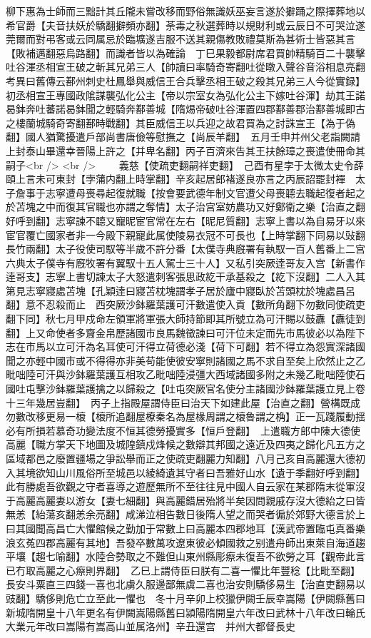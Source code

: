 柳下惠為士師而三黜計其丘隴未嘗改移而野俗無識妖巫妄言遂於擗踊之際擇葬地以希官爵【夫音扶妖於驕翻擗頻亦翻】荼毒之秋選葬時以規財利或云辰日不可哭泣遂莞爾而對弔客或云同属忌於臨壙遂吉服不送其親傷教敗禮莫斯為甚術士皆惡其言【敗補邁翻惡烏路翻】而識者皆以為確論　丁巳果毅都尉席君買帥精騎百二十襲擊吐谷渾丞相宣王破之斬其兄弟三人【帥讀曰率騎奇寄翻吐從暾入聲谷音浴相息亮翻　考異曰舊傳云鄯州刺史杜鳳舉與威信王合兵擊丞相王破之殺其兄弟三人今從實録】初丞相宣王專國政隂謀襲弘化公主【帝以宗室女為弘化公主下嫁吐谷渾】劫其王諾曷鉢奔吐蕃諾曷鉢聞之輕騎奔鄯善城【隋焬帝破吐谷渾置四郡鄯善郡治鄯善城即古之樓蘭城騎奇寄翻鄯時戰翻】其臣威信王以兵迎之故君買為之討誅宣王【為于偽翻】國人猶驚擾遣戶部尚書唐儉等慰撫之【尚辰羊翻】　五月壬申并州父老詣闕請上封泰山畢還幸晉陽上許之【并卑名翻】丙子百濟來告其王扶餘璋之喪遣使冊命其嗣子<br />
<br />
　　義慈【使疏吏翻嗣祥吏翻】　己酉有星孛于太微太史令薛頤上言未可東封【孛蒲内翻上時掌翻】辛亥起居郎褚遂良亦言之丙辰詔罷封襌　太子詹事于志寧遭母喪尋起復就職【按會要武德年制文官遭父母喪聼去職起復者起之於苫塊之中而復其官職也亦謂之奪情】太子治宫室妨農功又好鄭衛之樂【治直之翻好呼到翻】志寧諫不聼又寵昵宦官常在左右【昵尼質翻】志寧上書以為自易牙以來宦官覆亡國家者非一今殿下親寵此属使陵易衣冠不可長也【上時掌翻下同易以䜴翻長竹兩翻】太子役使司馭等半歲不許分番【太僕寺典廐署有執馭一百人舊番上二宫六典太子僕寺有廐牧署有翼馭十五人駕士三十人】又私引突厥逹哥友入宫【新書作逹哥支】志寧上書切諫太子大怒遣刺客張思政紇干承基殺之【紇下沒翻】二人入其第見志寧寢處苫塊【孔穎逹曰寢苫枕塊謂孝子居於廬中寢臥於苫頭枕於塊處昌呂翻】意不忍殺而止　西突厥沙鉢羅葉護可汗數遣使入貢【數所角翻下勿數同使疏吏翻下同】秋七月甲戍命左領軍將軍張大師持節即其所號立為可汗賜以鼓纛【纛徒到翻】上又命使者多齎金帛歷諸國市良馬魏徵諫曰可汗位未定而先市馬彼必以為陛下志在市馬以立可汗為名耳使可汗得立荷德必淺【荷下可翻】若不得立為怨實深諸國聞之亦輕中國市或不得得亦非美苟能使彼安寧則諸國之馬不求自至矣上欣然止之乙毗咄陸可汗與沙鉢羅葉護互相攻乙毗咄陸浸彊大西域諸國多附之未幾乙毗咄陸使石國吐屯擊沙鉢羅葉護擒之以歸殺之【吐屯突厥官名使分主諸國沙鉢羅葉護立見上卷十三年幾居豈翻】　丙子上指殿屋謂侍臣曰治天下如建此屋【治直之翻】營構既成勿數改移更易一榱【榱所追翻屋橑秦名為屋椽周謂之榱魯謂之桷】正一瓦踐履動揺必有所損若慕奇功變法度不恒其德勞擾實多【恒戶登翻】　上遣職方郎中陳大德使高麗【職方掌天下地圖及城隍鎮戍烽候之數辯其邦國之遠近及四夷之歸化凡五方之區域都邑之廢置疆場之爭訟舉而正之使疏吏翻麗力知翻】八月己亥自高麗還大德初入其境欲知山川風俗所至城邑以綾綺遺其守者曰吾雅好山水【遺于季翻好呼到翻】此有勝處吾欲觀之守者喜導之遊歷無所不至往往見中國人自云家在某郡隋末從軍沒于高麗高麗妻以游女【妻七細翻】與高麗錯居殆將半矣因問親戚存沒大德紿之曰皆無恙【紿蕩亥翻恙余亮翻】咸涕泣相告數日後隋人望之而哭者徧於郊野大德言於上曰其國聞高昌亡大懼館候之勤加于常數上曰高麗本四郡地耳【漢武帝置臨屯真番樂浪玄菟四郡高麗有其地】吾發卒數萬攻遼東彼必傾國救之别遣舟師出東萊自海道趨平壤【趨七喻翻】水陸合勢取之不難但山東州縣彫瘵未復吾不欲勞之耳【觀帝此言已冇取高麗之心瘵則界翻】　乙巳上謂侍臣曰朕有二喜一懼比年豐稔【比毗至翻】長安斗粟直三四錢一喜也北虜久服邊鄙無虞二喜也治安則驕侈易生【治直吏翻易以豉翻】驕侈則危亡立至此一懼也　冬十月辛卯上校獵伊闕壬辰幸嵩陽【伊闕縣舊曰新城隋開皇十八年更名有伊闕嵩陽縣舊曰潁陽隋開皇六年改曰武林十八年改曰輪氏大業元年改曰嵩陽有嵩高山並属洛州】辛丑還宫　并州大都督長史